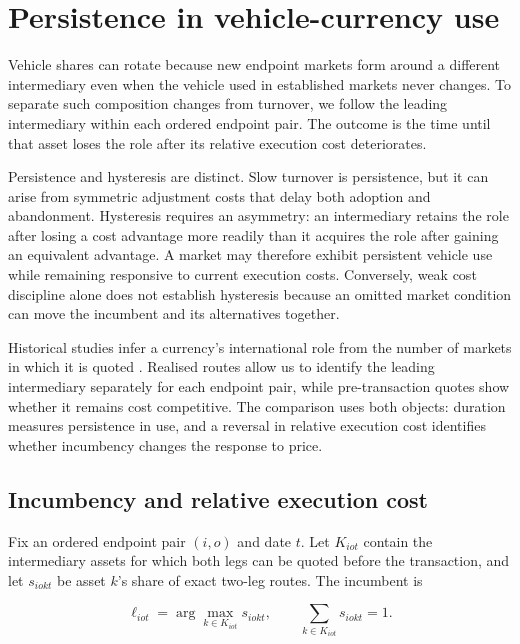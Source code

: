 
\section{Persistence in vehicle-currency use}
\label{sec:survival}

Vehicle shares can rotate because new endpoint markets form around a different intermediary even when the vehicle used in established markets never changes. To separate such composition changes from turnover, we follow the leading intermediary within each ordered endpoint pair. The outcome is the time until that asset loses the role after its relative execution cost deteriorates.

Persistence and hysteresis are distinct. Slow turnover is persistence, but it can arise from symmetric adjustment costs that delay both adoption and abandonment. Hysteresis requires an asymmetry: an intermediary retains the role after losing a cost advantage more readily than it acquires the role after gaining an equivalent advantage. A market may therefore exhibit persistent vehicle use while remaining responsive to current execution costs. Conversely, weak cost discipline alone does not establish hysteresis because an omitted market condition can move the incumbent and its alternatives together.

Historical studies infer a currency's international role from the number of markets in which it is quoted \citep{FlandreauJobst2009Empirics}. Realised routes allow us to identify the leading intermediary separately for each endpoint pair, while pre-transaction quotes show whether it remains cost competitive. The comparison uses both objects: duration measures persistence in use, and a reversal in relative execution cost identifies whether incumbency changes the response to price.

\subsection{Incumbency and relative execution cost}
\label{sec:survival:question}
\label{sec:survival:notation}

Fix an ordered endpoint pair $(i,o)$ and date $t$. Let $K_{iot}$ contain the intermediary assets for which both legs can be quoted before the transaction, and let $s_{iokt}$ be asset $k$'s share of exact two-leg routes. The incumbent is

\begin{equation}
\ell_{iot}=\arg\max_{k\in K_{iot}}s_{iokt},
\qquad \sum_{k\in K_{iot}}s_{iokt}=1.
\label{eq:incumbent}
\end{equation}

